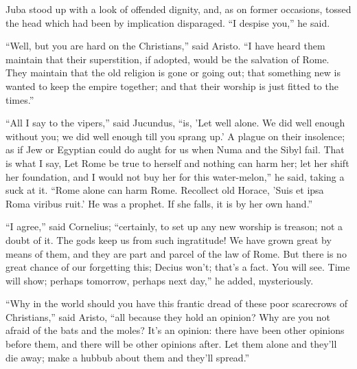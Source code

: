 Juba stood up with a look of offended dignity, and, as on former
occasions, tossed the head which had been by implication disparaged.
``I despise you,'' he said.

``Well, but you are hard on the Christians,'' said Aristo.
``I have heard them maintain that their superstition, if adopted,
would be the salvation of Rome. They maintain that the old religion is
gone or going out; that something new is wanted to keep the empire
together; and that their worship is just fitted to the times.''

``All I say to the vipers,'' said Jucundus, ``is, 'Let
well alone. We did well enough without you; we did well enough till
you sprang up.' A plague on their insolence; as if Jew or Egyptian
could do aught for us when Numa and the Sibyl fail. That is what I
say, Let Rome be true to herself and nothing can harm her; let her
shift her foundation, and I would not buy her for this
water-melon,'' he said, taking a suck at it. ``Rome alone can
harm Rome. Recollect old Horace, 'Suis et ipsa Roma viribus ruit.'
He was a prophet. If she falls, it is by her own hand.''

``I agree,'' said Cornelius; ``certainly, to set up any
new worship is treason; not a doubt of it. The gods keep us from such
ingratitude! We have grown great by means of them, and they are part
and parcel of the law of Rome. But there is no great chance of our
forgetting this; Decius won't; that's a fact. You will see. Time will
show; perhaps tomorrow, perhaps next day,'' he added,
mysteriously.

``Why in the world should you have this frantic dread of these
poor scarecrows of Christians,'' said Aristo, ``all because
they hold an opinion? Why are you not afraid of the bats and the
moles? It's an opinion: there have been other opinions before them,
and there will be other opinions after. Let them alone and they'll die
away; make a hubbub about them and they'll spread.''

